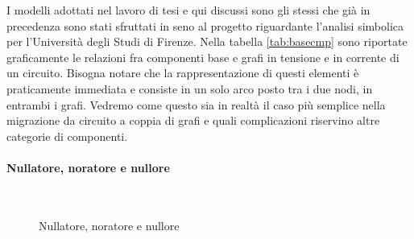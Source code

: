 I modelli adottati nel lavoro di tesi e qui discussi sono gli stessi che già in precedenza sono stati sfruttati in seno al progetto riguardante l'analisi simbolica per l'Università degli Studi di Firenze. Nella tabella \ref{tab:basecmp} sono riportate graficamente le relazioni fra componenti base e grafi in tensione e in corrente di un circuito. Bisogna notare che la rappresentazione di questi elementi è praticamente immediata e consiste in un solo arco posto tra i due nodi, in entrambi i grafi. Vedremo come questo sia in realtà il caso più semplice nella migrazione da circuito a coppia di grafi e quali complicazioni riservino altre categorie di componenti.

\paragraph{Nullatore, noratore e nullore}

\begin{figure}[b]
 \centering
 \hspace{25pt}
 \\
 \caption{Nullatore, noratore e nullore}
 \label{fig:nullorcmp}
\end{figure}

